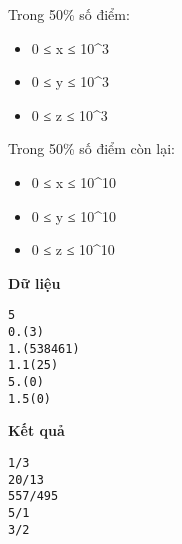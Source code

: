 Trong 50\% số điểm:  
\begin{itemize}
	\item     0 ≤ x ≤ 10^3   
	\item     0 ≤ y ≤ 10^3   
	\item     0 ≤ z ≤ 10^3   
\end{itemize}

   Trong 50\% số điểm còn lại:  
\begin{itemize}
	\item     0 ≤ x ≤ 10^10   
	\item     0 ≤ y ≤ 10^10   
	\item     0 ≤ z ≤ 10^10   
\end{itemize}
\textbf{    Dữ liệu   }
\begin{verbatim}
5
0.(3)
1.(538461)
1.1(25)
5.(0)
1.5(0)
\end{verbatim}

\textbf{    Kết quả   }
\begin{verbatim}
1/3
20/13
557/495
5/1
3/2
\end{verbatim}